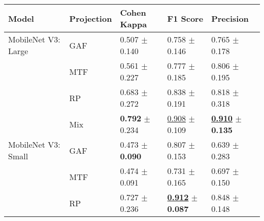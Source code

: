 
\begin{tabular}{lllll}
\toprule
Model & Projection & Cohen Kappa & F1 Score & Precision \\
\midrule
MobileNet V3: Large & GAF & \textcolor[rgb]{0.8927157561,0.1072842439,0}{0.507} $\pm$ \textcolor[rgb]{0.2718412315,0.5000000000,0}{0.140} & \textcolor[rgb]{0.8489208633,0.1510791367,0}{0.758} $\pm$ \textcolor[rgb]{0.5671384454,0.4328615546,0}{0.146} & \textcolor[rgb]{0.5337995338,0.4662004662,0}{0.765} $\pm$ \textcolor[rgb]{0.2345974767,0.5000000000,0}{0.178} \\
 & MTF & \textcolor[rgb]{0.7244655582,0.2755344418,0}{0.561} $\pm$ \textcolor[rgb]{0.7534589401,0.2465410599,0}{0.227} & \textcolor[rgb]{0.7476685318,0.2523314682,0}{0.777} $\pm$ \textcolor[rgb]{0.9388727094,0.0611272906,0}{0.185} & \textcolor[rgb]{0.3846153846,0.5000000000,0}{0.806} $\pm$ \textcolor[rgb]{0.3297922028,0.5000000000,0}{0.195} \\
 & RP & \textcolor[rgb]{0.3396674584,0.5000000000,0}{0.683} $\pm$ \textcolor[rgb]{1.0000000000,0.0000000000,0}{0.272} & \textcolor[rgb]{0.4076738609,0.5000000000,0}{0.838} $\pm$ \textcolor[rgb]{1.0000000000,0.0000000000,0}{0.191} & \textcolor[rgb]{0.3379953380,0.5000000000,0}{0.818} $\pm$ \textcolor[rgb]{1.0000000000,0.0000000000,0}{0.318} \\
 & Mix & \textbf{\textcolor[rgb]{0.0000000000,0.5000000000,0}{0.792}} $\pm$ \textcolor[rgb]{0.7942442572,0.2057557428,0}{0.234} & \underline{\textcolor[rgb]{0.0207833733,0.5000000000,0}{0.908}} $\pm$ \textcolor[rgb]{0.2113812866,0.5000000000,0}{0.109} & \underline{\textbf{\textcolor[rgb]{0.0000000000,0.5000000000,0}{0.910}}} $\pm$ \textbf{\textcolor[rgb]{0.0000000000,0.5000000000,0}{0.135}} \\
MobileNet V3: Small & GAF & \textcolor[rgb]{1.0000000000,0.0000000000,0}{0.473} $\pm$ \textbf{\textcolor[rgb]{0.0000000000,0.5000000000,0}{0.090}} & \textcolor[rgb]{0.5824340528,0.4175659472,0}{0.807} $\pm$ \textcolor[rgb]{0.6312580337,0.3687419663,0}{0.153} & \textcolor[rgb]{1.0000000000,0.0000000000,0}{0.639} $\pm$ \textcolor[rgb]{0.8063363991,0.1936636009,0}{0.283} \\
 & MTF & \textcolor[rgb]{0.9972288203,0.0027711797,0}{0.474} $\pm$ \textcolor[rgb]{0.0053005756,0.5000000000,0}{0.091} & \textcolor[rgb]{1.0000000000,0.0000000000,0}{0.731} $\pm$ \textcolor[rgb]{0.7425368432,0.2574631568,0}{0.165} & \textcolor[rgb]{0.7855477855,0.2144522145,0}{0.697} $\pm$ \textcolor[rgb]{0.0832310645,0.5000000000,0}{0.150} \\
 & RP & \textcolor[rgb]{0.2019002375,0.5000000000,0}{0.727} $\pm$ \textcolor[rgb]{0.8031342191,0.1968657809,0}{0.236} & \underline{\textbf{\textcolor[rgb]{0.0000000000,0.5000000000,0}{0.912}}} $\pm$ \textbf{\textcolor[rgb]{0.0000000000,0.5000000000,0}{0.087}} & \textcolor[rgb]{0.2261072261,0.5000000000,0}{0.848} $\pm$ \textcolor[rgb]{0.0716703012,0.5000000000,0}{0.148} \\

\end{tabular}
